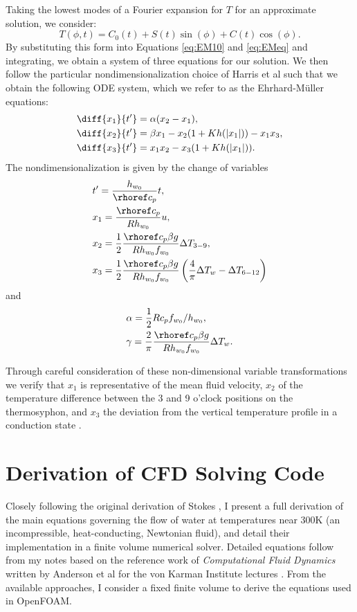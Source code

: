 Taking the lowest modes of a Fourier expansion for $T$ for an approximate solution, we consider:
\begin{equation} T(\phi , t) = C_0 (t) + S(t) \sin (\phi ) + C(t) \cos (\phi) . \end{equation}
By substituting this form into Equations \ref{eq:EM10} and \ref{eq:EMeq} and integrating, we obtain a system of three equations for our solution.
We then follow the particular nondimensionalization choice of Harris et al such that we obtain the following ODE system, which we refer to as the Ehrhard-M\"{u}ller equations:
\begin{align}
& \diff{x_1}{t'} = \alpha (x_2 - x_1),\\
& \diff{x_2}{t'} = \beta x_1 - x_2 (1 + Kh(|x_1|)) - x_1x_3,\\
& \diff{x_3}{t'} = x_1x_2 - x_3 (1 + Kh(|x_1|)) .\end{align}
The nondimensionalization is given by the change of variables
\begin{align}
& t' = \frac{h_{w_0}}{\rhoref c_p}t,\\
& x_1 = \frac{\rhoref c_p }{R h_{w_0}} u, \\
& x_2 = \frac{1}{2} \frac{\rhoref c_p \beta g}{ R h_{w_0} f_{w_0}} \Delta T_{3-9}, \\
& x_3 = \frac{1}{2} \frac{\rhoref c_p \beta g}{ R h_{w_0} f_{w_0}} \left ( \frac{4}{\pi} \Delta T_w - \Delta T_{6-12} \right ) 
\end{align}
and
\begin{align}
& \alpha = \frac{1}{2} R c_p f_{w_0} / h_{w_0} ,\\
& \gamma = \frac{2}{\pi} \frac{\rhoref c_p \beta g}{Rh_{w_0} f_{w_0}} \Delta T_w. \end{align}

Through careful consideration of these non-dimensional variable transformations we verify that $x_1$ is representative of the mean fluid velocity, $x_2$ of the temperature difference between the 3 and 9 o'clock positions on the thermosyphon, and $x_3$ the deviation from the vertical temperature profile in a conduction state .



\chapter{Derivation of CFD Solving Code}

Closely following the original derivation of Stokes , I present a full derivation of the main equations governing the flow of water at temperatures near 300K (an incompressible, heat-conducting, Newtonian fluid), and detail their implementation in a finite volume numerical solver.
Detailed equations follow from my notes based on the reference work of {\em Computational Fluid Dynamics} written by Anderson et al for the von Karman Institute lectures .
From the available approaches, I consider a fixed finite volume to derive the equations used in OpenFOAM.

